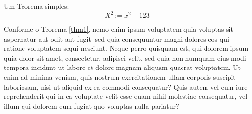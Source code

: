 %
%
\begin{thm}
Um Teorema simples:
\begin{equation}
X^2 := x^2 - 123
\label{thm1}
\end{equation}
\end{thm}

\lipsum[13] 

%
Conforme o Teorema \ref{thm1}, nemo enim ipsam voluptatem quia voluptas sit aspernatur aut odit aut fugit, sed quia consequuntur magni dolores eos qui ratione voluptatem sequi nesciunt. Neque porro quisquam est, qui dolorem ipsum quia dolor sit amet, consectetur, adipisci velit, sed quia non numquam eius modi tempora incidunt ut labore et dolore magnam aliquam quaerat voluptatem. Ut enim ad minima veniam, quis nostrum exercitationem ullam corporis suscipit laboriosam, nisi ut aliquid ex ea commodi consequatur? Quis autem vel eum iure reprehenderit qui in ea voluptate velit esse quam nihil molestiae consequatur, vel illum qui dolorem eum fugiat quo voluptas nulla pariatur?


